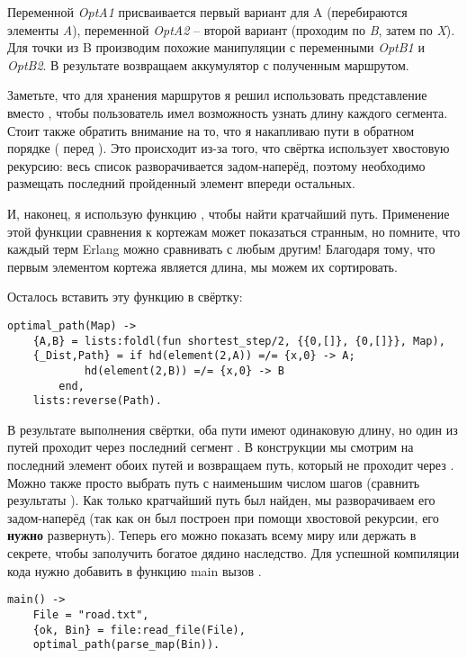 Переменной \emph{OptA1} присваивается первый вариант для A (перебираются элементы \emph{A}), переменной \emph{OptA2} \--- второй вариант (проходим по \emph{B}, затем по \emph{X}).
Для точки из B производим похожие манипуляции с переменными \emph{OptB1} и \emph{OptB2}.
В результате возвращаем аккумулятор с полученным маршрутом.

Заметьте, что для хранения маршрутов я решил использовать представление \ops{[\{x,X\}]} вместо \ops{[x]}, чтобы пользователь имел возможность узнать длину каждого сегмента.
Стоит также обратить внимание на то, что я накапливаю пути в обратном порядке ( перед ).
Это происходит из\--за того, что свёртка использует хвостовую рекурсию: весь список разворачивается задом\--наперёд, поэтому необходимо размещать последний пройденный элемент впереди остальных.

И, наконец, я использую функцию , чтобы найти кратчайший путь.
Применение этой функции сравнения к кортежам может показаться странным, но помните, что каждый терм Erlang можно сравнивать с любым другим!
Благодаря тому, что первым элементом кортежа является длина, мы можем их сортировать.

Осталось вставить эту функцию в свёртку:
\begin{lstlisting}[style=erlang]
optimal_path(Map) ->
    {A,B} = lists:foldl(fun shortest_step/2, {{0,[]}, {0,[]}}, Map),
    {_Dist,Path} = if hd(element(2,A)) =/= {x,0} -> A;
            hd(element(2,B)) =/= {x,0} -> B
        end,
    lists:reverse(Path).
\end{lstlisting}

В результате выполнения свёртки, оба пути имеют одинаковую длину, но один из путей проходит через последний сегмент .
В конструкции  мы смотрим на последний элемент обоих путей и возвращаем путь, который не проходит через .
Можно также просто выбрать путь с наименьшим числом шагов (сравнить результаты ).
Как только кратчайший путь был найден, мы разворачиваем его задом\--наперёд (так как он был построен при помощи хвостовой рекурсии, его \textbf{нужно} развернуть).
Теперь его можно показать всему миру или держать в секрете, чтобы заполучить богатое дядино наследство.
Для успешной компиляции кода нужно добавить в функцию main вызов .
\begin{lstlisting}[style=erlang]
main() ->
    File = "road.txt",
    {ok, Bin} = file:read_file(File),
    optimal_path(parse_map(Bin)).
\end{lstlisting}

